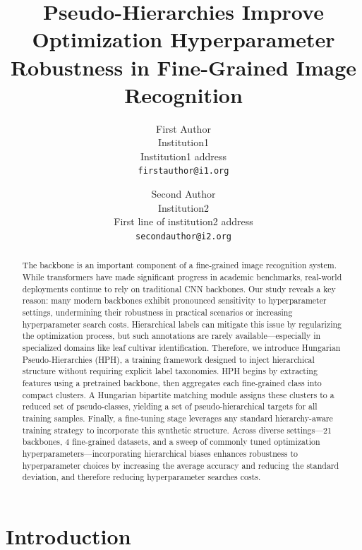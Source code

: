 \documentclass[10pt,twocolumn,letterpaper]{article}
\title{Pseudo-Hierarchies Improve Optimization Hyperparameter Robustness in Fine-Grained Image Recognition}
\author{First Author\\
Institution1\\
Institution1 address\\
{\tt\small firstauthor@i1.org}
\and
Second Author\\
Institution2\\
First line of institution2 address\\
{\tt\small secondauthor@i2.org}
}
\begin{document}
\maketitle
\begin{abstract}
The backbone is an important component of a fine-grained image recognition system. While transformers have made significant progress in academic benchmarks, real-world deployments continue to rely on traditional CNN backbones. Our study reveals a key reason: many modern backbones exhibit pronounced sensitivity to hyperparameter settings, undermining their robustness in practical scenarios or increasing hyperparameter search costs. Hierarchical labels can mitigate this issue by regularizing the optimization process, but such annotations are rarely available—especially in specialized domains like leaf cultivar identification. Therefore, we introduce Hungarian Pseudo-Hierarchies (HPH), a training framework designed to inject hierarchical structure without requiring explicit label taxonomies. HPH begins by extracting features using a pretrained backbone, then aggregates each fine-grained class into compact clusters. A Hungarian bipartite matching module assigns these clusters to a reduced set of pseudo-classes, yielding a set of pseudo-hierarchical targets for all training samples. Finally, a fine-tuning stage leverages any standard hierarchy-aware training strategy to incorporate this synthetic structure. Across diverse settings—21 backbones, 4 fine-grained datasets, and a sweep of commonly tuned optimization hyperparameters—incorporating hierarchical biases enhances robustness to hyperparameter choices by increasing the average accuracy and reducing the standard deviation, and therefore reducing hyperparameter searches costs.
\end{abstract}

\section{Introduction}
\label{sec_introduction}
\end{document}
